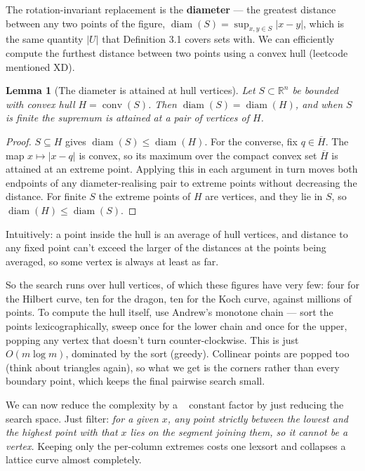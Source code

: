 \documentclass[11pt, a4paper]{article}
\theoremstyle{plain}
\newtheorem{lemma}[theorem]{Lemma}
\theoremstyle{definition}
\theoremstyle{remark}
\DeclareMathOperator{\diam}{diam}
\newcommand{\R}{\mathbb{R}}
\begin{document}
\noindent The rotation-invariant replacement is the \textbf{diameter} ---
the greatest distance between any two points of the figure,
$\diam(S)=\sup_{x,y\in S}|x-y|$, which is the same quantity $|U|$ that
Definition 3.1 covers sets with. We can efficiently compute the furthest distance between two points using a convex hull (leetcode mentioned XD).

\begin{lemma}[The diameter is attained at hull vertices]
\label{lem:hull}
    Let $S\subset\R^n$ be bounded with convex hull $H=\operatorname{conv}(S)$.
    Then $\diam(S)=\diam(H)$, and when $S$ is finite the supremum is attained
    at a pair of vertices of $H$.
\end{lemma}
\begin{proof}
    $S\subseteq H$ gives $\diam(S)\leq\diam(H)$. For the converse, fix
    $q\in\overline{H}$. The map $x\mapsto|x-q|$ is convex, so its maximum over
    the compact convex set $\overline{H}$ is attained at an extreme point.
    Applying this in each argument in turn moves both endpoints of any
    diameter-realising pair to extreme points without decreasing the distance.
    For finite $S$ the extreme points of $H$ are vertices, and they lie in $S$,
    so $\diam(H)\leq\diam(S)$.
\end{proof}

\noindent Intuitively: a point inside the hull is an average of hull vertices, and distance to any fixed point can’t exceed the larger of the distances at the points being averaged, so some vertex is always at least as far.

So the search runs over hull vertices, of which these figures have very few: four for the Hilbert curve, ten for the dragon, ten for the Koch curve, against millions of points. 
To compute the hull itself, use Andrew's monotone chain --- 
sort the points lexicographically, sweep once for the lower chain and once for the upper, popping any vertex that doesn't turn counter-clockwise. 
This is just $O(m\log m)$, dominated by the sort (greedy). Collinear points are popped too (think about triangles again), 
so what we get is the corners rather than every boundary point, which keeps the final pairwise search small.

We can now reduce the complexity by a ~ constant factor by just reducing the search space.
Just filter: \emph{for a given $x$, any point strictly between the lowest and the highest point with that $x$ lies on the segment joining them, so it cannot be a vertex.}
Keeping only the per-column extremes costs one lexsort and collapses a lattice curve almost completely.
\end{document}
